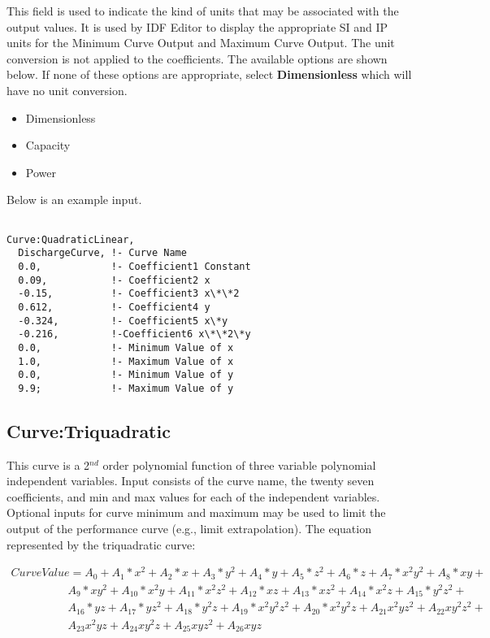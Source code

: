 This field is used to indicate the kind of units that may be associated with the output values. It is used by IDF Editor to display the appropriate SI and IP units for the Minimum Curve Output and Maximum Curve Output. The unit conversion is not applied to the coefficients. The available options are shown below. If none of these options are appropriate, select \textbf{Dimensionless} which will have no unit conversion.

\begin{itemize}
\item
  Dimensionless
\item
  Capacity
\item
  Power
\end{itemize}

Below is an example input.

\begin{lstlisting}

Curve:QuadraticLinear,
  DischargeCurve, !- Curve Name
  0.0,            !- Coefficient1 Constant
  0.09,           !- Coefficient2 x
  -0.15,          !- Coefficient3 x\*\*2
  0.612,          !- Coefficient4 y
  -0.324,         !- Coefficient5 x\*y
  -0.216,         !-Coefficient6 x\*\*2\*y
  0.0,            !- Minimum Value of x
  1.0,            !- Maximum Value of x
  0.0,            !- Minimum Value of y
  9.9;            !- Maximum Value of y
\end{lstlisting}

\subsection{Curve:Triquadratic}\label{curvetriquadratic}

This curve is a 2\(^{nd}\) order polynomial function of three variable polynomial independent variables. Input consists of the curve name, the twenty seven coefficients, and min and max values for each of the independent variables. Optional inputs for curve minimum and maximum may be used to limit the output of the performance curve (e.g., limit extrapolation). The equation represented by the triquadratic curve:

\begin{equation}
  \begin{array}{l}
    CurveValue = {A_0} + {A_1}*{x^2} + {A_2}*x + {A_3}*{y^2} + {A_4}*y + {A_5}*{z^2} + {A_6}*z + {A_7}*{x^2}{y^2} + {A_8}*xy + \\
    \quad \quad \quad \quad \quad {A_9}*x{y^2} + {A_{10}}*{x^2}y + {A_{11}}*{x^2}{z^2} + {A_{12}}*xz + {A_{13}}*x{z^2} + {A_{14}}*{x^2}z + {A_{15}}*{y^2}{z^2} + \\
    \quad \quad \quad \quad \quad {A_{16}}*yz + {A_{17}}*y{z^2} + {A_{18}}*{y^2}z + {A_{19}}*{x^2}{y^2}{z^2} + {A_{20}}*{x^2}{y^2}z + {A_{21}}{x^2}y{z^2} + {A_{22}}x{y^2}{z^2} + \\
    \quad \quad \quad \quad \quad {A_{23}}{x^2}yz + {A_{24}}x{y^2}z + {A_{25}}xy{z^2} + {A_{26}}xyz
  \end{array}
\end{equation}

